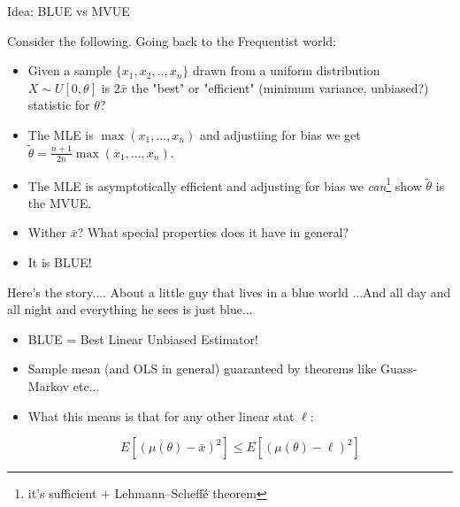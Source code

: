 \documentclass[11pt]{beamer}
\begin{document}
\begin{frame}{Idea: BLUE vs MVUE}

Consider the following. Going back to the Frequentist world:

\begin{itemize}

\item Given a sample $\lbrace x_1, x_2,..,x_n \rbrace$ drawn from a uniform distribution $X \sim U[0,\theta]$ is $2\bar{x}$ the "best" or "efficient" (minimum variance, unbiased?) statistic for $\theta$?

\vfill

\item The MLE is $\max(x_1, ..., x_n)$ and adjustiing for bias we get $\tilde{\theta} = \frac{n+1}{2n}\max(x_1, ..., x_n)$.

\vfill

\item The MLE is asymptotically efficient and adjusting for bias we \textit{can}\footnote{it's sufficient + Lehmann–Scheffé theorem} show $\tilde{\theta}$ is the MVUE.

\vfill

\item[Q] Wither $\bar{x}$? What special properties does it have in general? 

\item[A] It is BLUE! 

\end{itemize}


\end{frame}
\begin{frame}{Here's the story....
About a little guy that lives in a blue world
...And all day and all night and everything he sees is just blue...}

\begin{itemize}

\item BLUE = Best Linear Unbiased Estimator!

\vfill

\item Sample mean (and OLS in general) guaranteed by theorems like Guass-Markov etc...

\vfill

\item What this means is that for any other linear stat $\ell$:

$$ E[ (\mu(\theta) - \bar{x})^2 ] \leq E[ (\mu(\theta) -  \ell )^2 ] $$


\end{itemize}

\end{frame}
\end{document}
